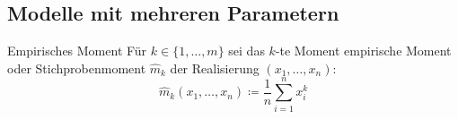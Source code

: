 \subsection*{Modelle mit mehreren Parametern}%
\label{sub:modelle_mit_mehreren_parametern}

\begin{definition}{Empirisches Moment}
	Für $k \in \{1, \dots, m\}$ sei das $k$-te Moment empirische Moment
	oder Stichprobenmoment $\hat{m}_k$ der Realisierung $(x_1, \dots, x_n)$:
	\begin{equation*}
		\hat{m}_k(x_1, \dots, x_n) \coloneqq \frac{1}{n} \sum_{i=1}^{n}  x_i^k
	\end{equation*}
\end{definition}

%
%

